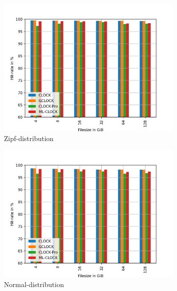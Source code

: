 \documentclass[
	12pt,
	a4paper,
	abstract,
	bibliography=totoc,
	chapterprefix,
	headings=openright,
	numbers=endperiod,
	parskip=half,
	twoside,
]{scrreprt}
\begin{document}
\begin{figure}[H]
	\centering
	\begin{subfigure}{0.4\textwidth}
		\includegraphics[width=\textwidth]{randread_zipf.jpg}		
		\caption{Zipf-distribution}
		\label{fig:randread zipf}
	\end{subfigure}
	\hfill
	\begin{subfigure}{0.4\textwidth}
		\includegraphics[width=\textwidth]{randread_normal.jpg}		
		\caption{Normal-distribution}
		\label{fig:randread normal}
	\end{subfigure}
	\hfill
	\begin{subfigure}{0.4\textwidth}

\end{subfigure}
\end{figure}
\end{document}
